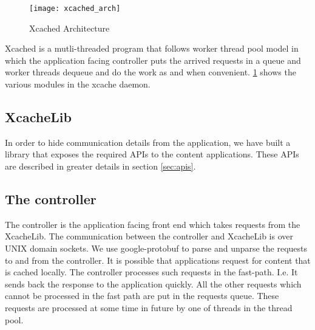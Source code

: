 \begin{figure}
  \begin{center}
    \texttt{[image: xcached\_arch]}
    \caption{Xcached Architecture}
    \label{fig:xcached_arch}
  \end{center}
\end{figure}
Xcached is a mutli-threaded program that follows worker thread pool
model in which the application facing controller puts the arrived
requests in a queue and worker threads dequeue and do the work as and
when convenient. \ref{fig:xcached_arch} shows the various modules in
the xcache daemon.

\subsection{XcacheLib}
In order to hide communication details from the application, we have
built a library that exposes the required APIs to the content
applications. These APIs are described in greater details in section
\ref{sec:apis}.

\subsection{The controller}
The controller is the application facing front end which takes
requests from the XcacheLib. The communication between the controller
and XcacheLib is over UNIX domain sockets. We use google-protobuf to
parse and unparse the requests to and from the controller. It is
possible that applications request for content that is cached
locally. The controller processes such requests in the
fast-path. I.e. It sends back the response to the application
quickly. All the other requests which cannot be processed in the fast
path are put in the requests queue. These requests are processed at
some time in future by one of threads in the thread pool.

